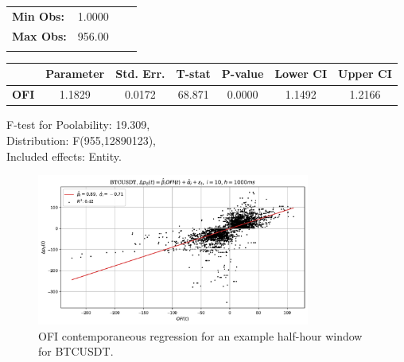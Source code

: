 \begin{table}[htbp!]
\begin{center}
\begin{tabular}{lclc}
\textbf{Min Obs:}          &       1.0000       & \textbf{                     }   &                  \\
\textbf{Max Obs:}          &       956.00       & \textbf{                     }   &                  \\
\textbf{}                  &                    & \textbf{                     }   &                  \\
\hline
\end{tabular}
\begin{tabular}{lcccccc}
             & \textbf{Parameter} & \textbf{Std. Err.} & \textbf{T-stat} & \textbf{P-value} & \textbf{Lower CI} & \textbf{Upper CI}  \\
\hline
\textbf{OFI} &       1.1829       &       0.0172       &      68.871     &      0.0000      &       1.1492      &       1.2166       \\
\hline
\end{tabular}
\end{center}
F-test for Poolability: 19.309, \\
Distribution: F(955,12890123),\\
Included effects: Entity.
\end{table}

\begin{figure}[htpb!]
    \centering
    \includegraphics[width=0.8\textwidth]{./images/btcusdt_h=1000ms_contemp_OFI.pdf}
    \caption{OFI contemporaneous regression for an example half-hour window for BTCUSDT.}
\end{figure}

\clearpage




